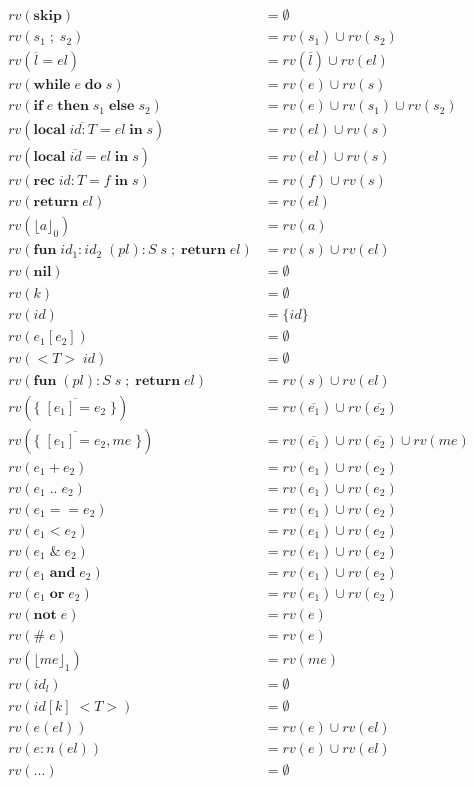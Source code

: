 \begin{align*}
rv(\mathbf{skip}) & = \emptyset\\
rv(s_{1} \;;\; s_{2}) & = rv(s_{1}) \cup rv(s_{2})\\
rv(\overline{l} = el) & = rv(\overline{l}) \cup rv(el)\\
rv(\mathbf{while} \; e \; \mathbf{do} \; s) & = rv(e) \cup rv(s)\\
rv(\mathbf{if} \; e \; \mathbf{then} \; s_{1} \; \mathbf{else} \; s_{2}) & = rv(e) \cup rv(s_{1}) \cup rv(s_{2})\\
rv(\mathbf{local} \; \overline{id{:}T} = el \; \mathbf{in} \; s) & = rv(el) \cup rv(s)\\
rv(\mathbf{local} \; \overline{id} = el \; \mathbf{in} \; s) & = rv(el) \cup rv(s)\\
rv(\mathbf{rec} \; id{:}T = f \; \mathbf{in} \; s) & = rv(f) \cup rv(s)\\
rv(\mathbf{return} \; el) & = rv(el)\\
rv(\lfloor a \rfloor_{0}) & = rv(a)\\
rv(\mathbf{fun} \; id_{1}{:}id_{2} \; (pl){:}S \; s \;;\; \mathbf{return} \; el) & = rv(s) \cup rv(el)\\
rv(\mathbf{nil}) & = \emptyset\\
rv(k) & = \emptyset\\
rv(id) & = \{ id \}\\
rv(e_{1}[e_{2}]) & = \emptyset\\
rv({<}T{>} \; id) & = \emptyset\\
rv(\mathbf{fun} \; (pl){:}S \; s \;;\; \mathbf{return} \; el) & = rv(s) \cup rv(el)\\
rv(\{ \; \overline{[e_{1}] = e_{2}} \; \}) & = rv(\overline{e_{1}}) \cup rv(\overline{e_{2}})\\
rv(\{ \; \overline{[e_{1}] = e_{2}},me \; \}) & = rv(\overline{e_{1}}) \cup rv(\overline{e_{2}}) \cup rv(me)\\
rv(e_{1} + e_{2}) & = rv(e_{1}) \cup rv(e_{2})\\
rv(e_{1} \; {..} \; e_{2}) & = rv(e_{1}) \cup rv(e_{2})\\
rv(e_{1} == e_{2}) & = rv(e_{1}) \cup rv(e_{2})\\
rv(e_{1} < e_{2}) & = rv(e_{1}) \cup rv(e_{2})\\
rv(e_{1} \;\&\; e_{2}) & = rv(e_{1}) \cup rv(e_{2})\\
rv(e_{1} \; \mathbf{and} \; e_{2}) & = rv(e_{1}) \cup rv(e_{2})\\
rv(e_{1} \; \mathbf{or} \; e_{2}) & = rv(e_{1}) \cup rv(e_{2})\\
rv(\mathbf{not} \; e) & = rv(e)\\
rv(\# \; e) & = rv(e)\\
rv(\lfloor me \rfloor_{1}) & = rv(me)\\
rv(id_{l}) & = \emptyset\\
rv(id[k] \; {<}T{>}) & = \emptyset\\
rv(e(el)) & = rv(e) \cup rv(el)\\
rv(e{:}n(el)) & = rv(e) \cup rv(el)\\
rv({...}) & = \emptyset
\end{align*}


